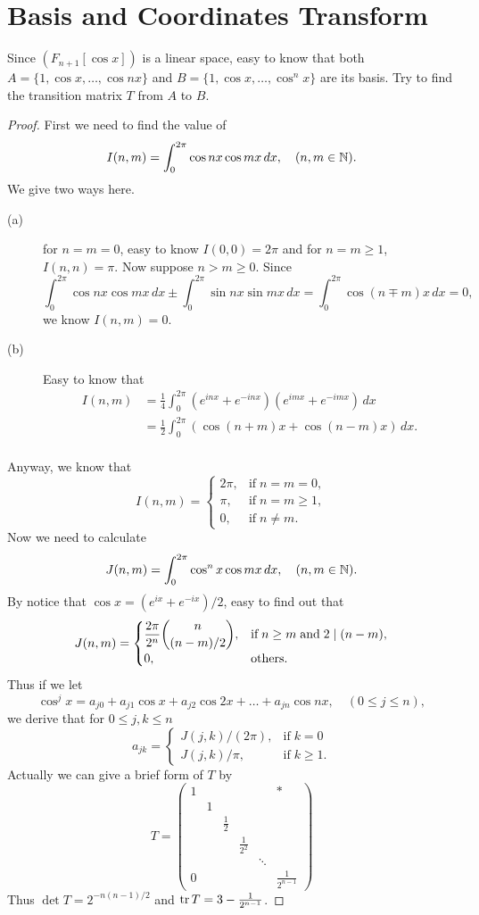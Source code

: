 \section{Basis and Coordinates Transform}
\begin{pro}%
	Since $(F_{n+1}[\cos x])$ is a linear space, easy to know that both $A=\{1,\cos x,\dots, \cos nx\}$ and $B=\{1,\cos x,\dots, \cos^n x\}$ are its basis. Try to find the transition matrix $T$ from $A$ to $B$.
\end{pro}
\begin{proof}
	First we need to find the value of
	\[I(n,m)=\int_0^{2\pi} \cos nx \cos mx\,dx,\quad (n,m\in \mathbb{N}).\]
	We give two ways here.
	\begin{description}
	\item[(a)] for $n=m=0$, easy to know $I(0,0)=2\pi$ and for $n=m\geq 1$, $I(n,n)=\pi$. Now suppose $n>m\geq 0$. 
	Since 
	\[\int_0^{2\pi} \cos nx \cos mx\,dx
	\pm \int_0^{2\pi} \sin nx \sin mx\,dx=
	\int_0^{2\pi} \cos (n\mp m)x \,dx=0,\]
	we know $I(n,m)=0$.
	\item[(b)] Easy to know that
	\begin{align*}
		I(n,m)&=\frac{1}{4}\int_0^{2\pi} (e^{inx}+e^{-inx})(e^{imx}+e^{-imx})\, dx\\
		&=\frac{1}{2}\int_0^{2\pi} (\cos(n+m)x +\cos(n-m) x)\,dx.\\
	\end{align*}
	\end{description}
	Anyway, we know that
	\[I(n,m)=\begin{cases}
	2\pi, &\mbox{if}\;n=m=0,\\
	\pi, &\mbox{if}\; n=m\geq 1,\\
	0, &\mbox{if}\; n\neq m.\end{cases}\]
	Now we need to calculate 
	\[J(n,m)=\int_0^{2\pi} \cos^n x \cos mx\,dx,\quad (n,m\in \mathbb{N}).\]
	By notice that $\cos x=(e^{ix}+e^{-ix})/2$, easy to find out that
	\[J(n,m)=\begin{cases}
	\dfrac{2\pi}{2^n} \dbinom{n}{(n-m)/2}, &\mbox{if}\; n\geq m\;\mbox{and}\; 2\mid (n-m),\\
	0, &\mbox{others}.\end{cases}\]
	Thus if we let 
	\[\cos^j x=a_{j0}+a_{j1}\cos x+a_{j2}\cos 2x+\dots +a_{jn} \cos nx,\quad(0\leq j\leq n),\]
	we derive that for $0\leq j,k\leq n$
	\[a_{jk}=\begin{cases}
	J(j,k)/(2\pi), &\mbox{if}\; k=0\\
	J(j,k)/\pi, &\mbox{if}\; k\geq 1.\end{cases}\]
	Actually we can give a brief form of $T$ by
	\[T=\begin{pmatrix}
	1& & & & &*\\
	 &1& & & & \\
	 & &\frac{1}{2}& & &\\
	 & & &\frac{1}{2^2}& & \\
	 & & & &\ddots&\\
	0& & & & &\frac{1}{2^{n-1}}
	\end{pmatrix}\]
	Thus $\det T=2^{-n(n-1)/2}$ and $\operatorname*{tr} T=3-\frac{1}{2^{n-1}}$.
\end{proof}

